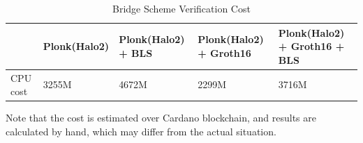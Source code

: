 \documentclass{article}
\begin{document}
\begin{table}[H]
    \centering
    \begin{tabular}{p{1.5cm}|p{2cm}|p{2cm}|p{2cm}|p{4cm}} \hline
          & Plonk(Halo2)&Plonk(Halo2) + BLS & Plonk(Halo2) + Groth16 & Plonk(Halo2) + Groth16 + BLS\\ \hline
          CPU cost & 3255M & 4672M & 2299M & 3716M \\ \hline
         
    \end{tabular}
    \caption{Bridge Scheme Verification Cost}
    \label{tab:my_label}
\end{table}

Note that the cost is estimated over Cardano blockchain, and results are calculated by hand, which may differ from the actual situation.
\end{document}
